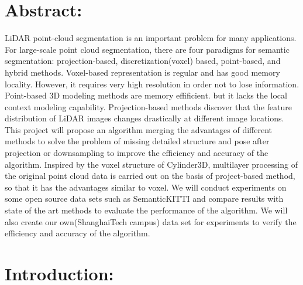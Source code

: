 \documentclass{article}
\begin{document}
    \begin{normalsize}
    
    	\section{Abstract:}
        LiDAR point-cloud segmentation is an important problem for many applications. For large-scale point cloud segmentation, there are four paradigms for semantic segmentation: projection-based, discretization(voxel) based, point-based, and hybrid methods. Voxel-based representation is regular and has good memory locality. However, it requires very high resolution in order not to lose information. Point-based 3D modeling methods are memory effificient. but it lacks the local context modeling capability. Projection-based methods discover that the feature distribution of LiDAR images changes drastically at different image locations. This project will propose an algorithm merging the advantages of different methods to solve the problem of missing detailed structure and pose after projection or downsampling to improve the efficiency and accuracy of the algorithm. Inspired by the voxel structure of Cylinder3D, multilayer processing of the original point cloud data is carried out on the basis of project-based method, so that it has the advantages similar to voxel. We will conduct experiments on some open source data sets such as SemanticKITTI and compare results with state of the art methods to evaluate the performance of the algorithm. We will also create our own(ShanghaiTech campus) data set for experiments to verify the efficiency and accuracy of the algorithm.    \\
      
		\section{Introduction:}
        

\end{normalsize}
\end{document}
